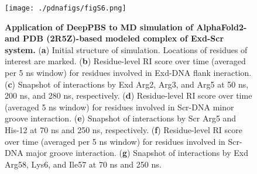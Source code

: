 \begin{center}
\begin{figure}[H]
  \texttt{[image: ./pdnafigs/figS6.png]}
    \caption[Application of DeepPBS to MD simulation of AlphaFold2- and PDB (2R5Z)-based modeled complex of Exd-
Scr system. ]{\textbf{Application of DeepPBS to MD simulation of AlphaFold2- and PDB (2R5Z)-based modeled complex of Exd-Scr system.} ({\bf a}) Initial structure of simulation. Locations of residues of interest are marked. ({\bf b}) Residue-level RI score over time (averaged per 5 ns window) for residues involved in Exd-DNA flank ineraction. ({\bf c}) Snapshot of interactions by Exd Arg2, Arg3, and Arg5 at 50 ns, 200 ns, and 280 ns, respectively. ({\bf d}) Residue-level RI score over time (averaged 5 ns window) for residues involved in Scr-DNA minor groove interaction. ({\bf e}) Snapshot of interactions by Scr Arg5 and His-12 at 70 ns and 250 ns, respectively. ({\bf f}) Residue-level RI score over time (averaged per 5 ns window) for residues involved in Scr-DNA major groove interaction. ({\bf g}) Snapshot of interactions by Exd Arg58, Lys6, and Ile57 at 70 ns and 250 ns.}
  \label{fig:pdnaS6}
\end{figure}
\end{center}
